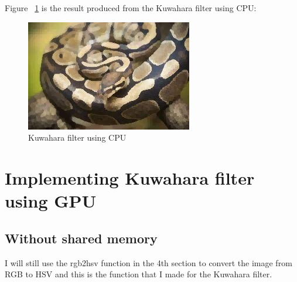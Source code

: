 \documentclass{article}
\begin{document}
	Figure ~\ref{fig:filter_image_cpu} is the result produced from the Kuwahara filter using CPU:
	
	\begin{figure}
		\includegraphics[width=\linewidth]{filtered_image_cpu.jpg}
		\caption{ Kuwahara filter using CPU}
		\label{fig:filter_image_cpu}
	\end{figure}
	
	\section{Implementing Kuwahara filter using GPU}
	
	\subsection{Without shared memory}
	
	I will still use the rgb2hsv function in the 4th section to convert the image from RGB to HSV and this is the function that I made for the Kuwahara filter.
	
\end{document}
